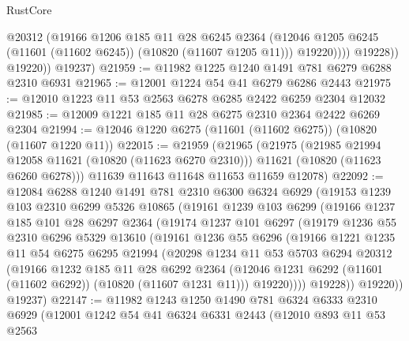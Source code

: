 \begin{lexlean}{RustCore}
\begin{coremodule}
                    @20312
                    (@19166
                      @1206
                      @185
                      @11
                      @28
                      @6245
                      @2364
                      (@12046 @1205 @6245 (@11601 (@11602 @6245)) (@10820 (@11607 @1205 @11)))
                      @19220))))
              @19228))
          @19220))
      @19237)
@21959 := @11982 @1225 @1240 @1491 @781 @6279 @6288 @2310 @6931
@21965 := @12001 @1224 @54 @41 @6279 @6286 @2443
@21975 := @12010 @1223 @11 @53 @2563 @6278 @6285 @2422 @6259 @2304 @12032
@21985 := @12009 @1221 @185 @11 @28 @6275 @2310 @2364 @2422 @6269 @2304
@21994 := @12046 @1220 @6275 (@11601 (@11602 @6275)) (@10820 (@11607 @1220 @11))
@22015 := @21959
    (@21965
      (@21975
        (@21985 @21994 @12058 @11621 (@10820 (@11623 @6270 @2310)))
        @11621
        (@10820 (@11623 @6260 @6278)))
      @11639
      @11643
      @11648
      @11653
      @11659
      @12078)
@22092 := @12084
    @6288
    @1240
    @1491
    @781
    @2310
    @6300
    @6324
    @6929
    (@19153
      @1239
      @103
      @2310
      @6299
      @5326
      @10865
      (@19161
        @1239
        @103
        @6299
        (@19166
          @1237
          @185
          @101
          @28
          @6297
          @2364
          (@19174
            @1237
            @101
            @6297
            (@19179
              @1236
              @55
              @2310
              @6296
              @5329
              @13610
              (@19161
                @1236
                @55
                @6296
                (@19166
                  @1221
                  @1235
                  @11
                  @54
                  @6275
                  @6295
                  @21994
                  (@20298
                    @1234
                    @11
                    @53
                    @5703
                    @6294
                    @20312
                    (@19166
                      @1232
                      @185
                      @11
                      @28
                      @6292
                      @2364
                      (@12046 @1231 @6292 (@11601 (@11602 @6292)) (@10820 (@11607 @1231 @11)))
                      @19220))))
              @19228))
          @19220))
      @19237)
@22147 := @11982
    @1243
    @1250
    @1490
    @781
    @6324
    @6333
    @2310
    @6929
    (@12001
      @1242
      @54
      @41
      @6324
      @6331
      @2443
      (@12010
        @893
        @11
        @53
        @2563

\end{coremodule}
\end{lexlean}
